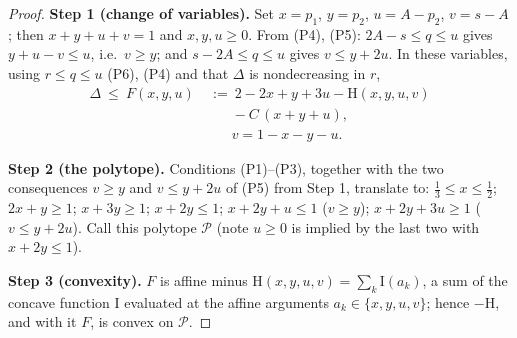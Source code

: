 \documentclass[journal]{IEEEtran}
\theoremstyle{definition}
\newcommand{\CC}{C}
\newcommand{\cP}{\mathcal{P}}
\begin{document}
\begin{proof}
\textbf{Step 1 (change of variables).} Set $x=p_1$, $y=p_2$, $u=A-p_2$,
$v=s-A$; then $x+y+u+v=1$ and $x,y,u\ge0$. From (P4), (P5):
$2A-s\le q\le u$ gives $y+u-v\le u$, i.e.\ $v\ge y$; and $s-2A\le q\le u$ gives
$v\le y+2u$. In these variables, using $r\le q\le u$ (P6), (P4) and that
$\Delta$ is nondecreasing in $r$,
\[
\begin{aligned}
  \Delta\ \le\ F(x,y,u)\ &:=\ 2-2x+y+3u-\mathrm H(x,y,u,v)\\
  &\phantom{{}:={}}-\CC\,(x+y+u),\\
  &\phantom{{}:={}}v=1-x-y-u .
\end{aligned}
\]

\textbf{Step 2 (the polytope).} Conditions (P1)--(P3), together with the two consequences $v\ge y$ and $v\le y+2u$ of (P5) from Step 1,
translate to: $\tfrac13\le x\le\tfrac12$; $2x+y\ge1$; $x+3y\ge1$; $x+2y\le1$;
$x+2y+u\le1$ ($v\ge y$); $x+2y+3u\ge1$ ($v\le y+2u$). Call this polytope
$\cP$ (note $u\ge0$ is implied by the last two with $x+2y\le1$).

\textbf{Step 3 (convexity).} $F$ is affine minus
$\mathrm H(x,y,u,v)=\sum_k\mathrm I(a_k)$, a sum of the concave function
$\mathrm I$ evaluated at the affine arguments $a_k\in\{x,y,u,v\}$; hence
$-\mathrm H$, and with it $F$, is convex on $\cP$.


\end{proof}
\end{document}
